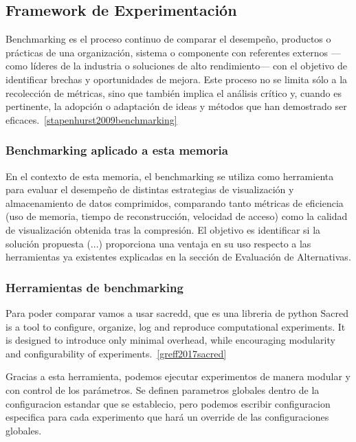 \subsection{Framework de Experimentación}

Benchmarking es el proceso continuo de comparar el desempeño, productos o prácticas de una organización, sistema o componente con referentes externos —como líderes de la industria o soluciones de alto rendimiento— con el objetivo de identificar brechas y oportunidades de mejora. Este proceso no se limita sólo a la recolección de métricas, sino que también implica el análisis crítico y, cuando es pertinente, la adopción o adaptación de ideas y métodos que han demostrado ser eficaces.~\ref{stapenhurst2009benchmarking}

\subsubsection{Benchmarking aplicado a esta memoria}

En el contexto de esta memoria, el benchmarking se utiliza como herramienta para evaluar el desempeño de distintas estrategias de visualización y almacenamiento de datos comprimidos, comparando tanto métricas de eficiencia (uso de memoria, tiempo de reconstrucción, velocidad de acceso) como la calidad de visualización obtenida tras la compresión. El objetivo es identificar si la solución propuesta (...) proporciona una ventaja en su uso respecto a las herramientas ya existentes explicadas en la sección de Evaluación de Alternativas.

\subsubsection{Herramientas de benchmarking}

Para poder comparar vamos a usar sacredd, que es una libreria de python Sacred is a tool to configure, organize, log and reproduce computational experiments. It is designed to introduce only minimal overhead, while encouraging modularity and configurability of experiments.~\ref{greff2017sacred}

Gracias a esta herramienta, podemos ejecutar experimentos de manera modular y con control de los parámetros. Se definen parametros globales dentro de la configuracion estandar que se establecio, pero podemos escribir configuracion especifica para cada experimento que hará un override de las configuraciones globales.

